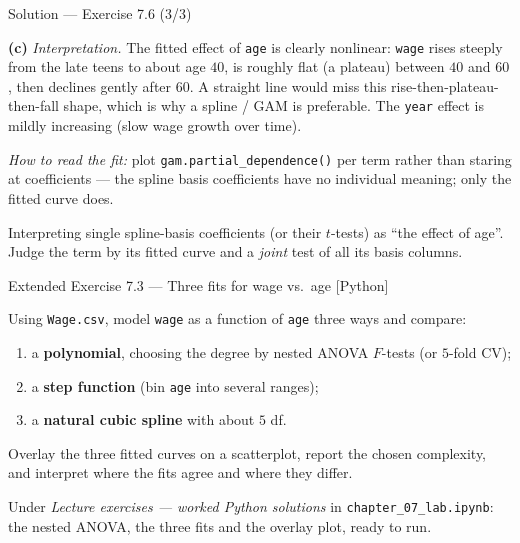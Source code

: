 \documentclass[aspectratio=169,11pt]{beamer}
\begin{document}
\begin{frame}{Solution --- Exercise 7.6 (3/3)}
\begin{solutionbox}
\textbf{(c)} \textit{Interpretation.} The fitted effect of \texttt{age} is clearly nonlinear: \texttt{wage} rises steeply from the late teens to about age $40$, is roughly flat (a plateau) between $40$ and $60$, then declines gently after $60$. A straight line would miss this rise-then-plateau-then-fall shape, which is why a spline / GAM is preferable. The \texttt{year} effect is mildly increasing (slow wage growth over time).

\medskip
\emph{How to read the fit:} plot \texttt{gam.partial\_dependence()} per term rather than staring at coefficients --- the spline basis coefficients have no individual meaning; only the fitted curve does.
\end{solutionbox}
\begin{mistake}
Interpreting single spline-basis coefficients (or their $t$-tests) as ``the effect of age''. Judge the term by its fitted curve and a \emph{joint} test of all its basis columns.
\end{mistake}
\end{frame}

\begin{frame}{Extended Exercise 7.3 --- Three fits for wage vs.\ age [Python]}
\begin{longexercise}
Using \texttt{Wage.csv}, model \texttt{wage} as a function of \texttt{age} three ways and compare:
\begin{enumerate}
  \item a \textbf{polynomial}, choosing the degree by nested ANOVA $F$-tests (or $5$-fold CV);
  \item a \textbf{step function} (bin \texttt{age} into several ranges);
  \item a \textbf{natural cubic spline} with about $5$ df.
\end{enumerate}
Overlay the three fitted curves on a scatterplot, report the chosen complexity, and interpret where the fits agree and where they differ.
\end{longexercise}
\begin{labnote}
Under \emph{Lecture exercises --- worked Python solutions} in \texttt{chapter\_07\_lab.ipynb}: the nested ANOVA, the three fits and the overlay plot, ready to run.
\end{labnote}
\end{frame}
\end{document}
